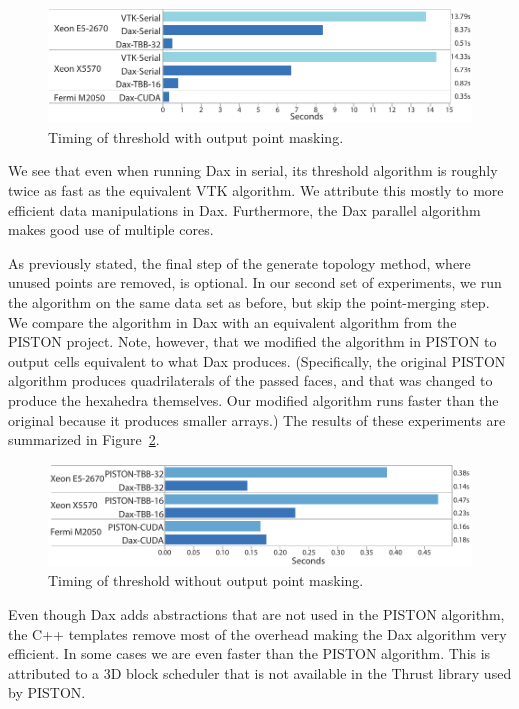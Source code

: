\begin{figure}[htb]
  \centering
  \includegraphics{images/TimingThresholdPointMask}
  \caption{Timing of threshold with output point masking.}
  \label{fig:TimingThresholdPointMask}
\end{figure}

We see that even when running Dax in serial, its threshold algorithm is
roughly twice as fast as the equivalent VTK algorithm. We attribute this
mostly to more efficient data manipulations in Dax. Furthermore, the Dax
parallel algorithm makes good use of multiple cores.

As previously stated, the final step of the generate topology method, where
unused points are removed, is optional. In our second set of experiments,
we run the algorithm on the same data set as before, but skip the
point-merging step. We compare the algorithm in Dax with an equivalent
algorithm from the PISTON project. Note, however, that we modified the
algorithm in PISTON to output cells equivalent to what Dax
produces. (Specifically, the original PISTON algorithm produces
quadrilaterals of the passed faces, and that was changed to produce the
hexahedra themselves. Our modified algorithm runs faster than the original
because it produces smaller arrays.) The results of these experiments are
summarized in Figure~\ref{fig:TimingThresholdNoPointMask}.

\begin{figure}[htb]
  \centering
  \includegraphics{images/TimingThresholdNoPointMask}
  \caption{Timing of threshold without output point masking.}
  \label{fig:TimingThresholdNoPointMask}
\end{figure}

Even though Dax adds abstractions that are not used in the PISTON
algorithm, the C++ templates remove most of the overhead making the Dax
algorithm very efficient. In some cases we are even faster than the PISTON
algorithm. This is attributed to a 3D block scheduler that is not available
in the Thrust library used by PISTON.

